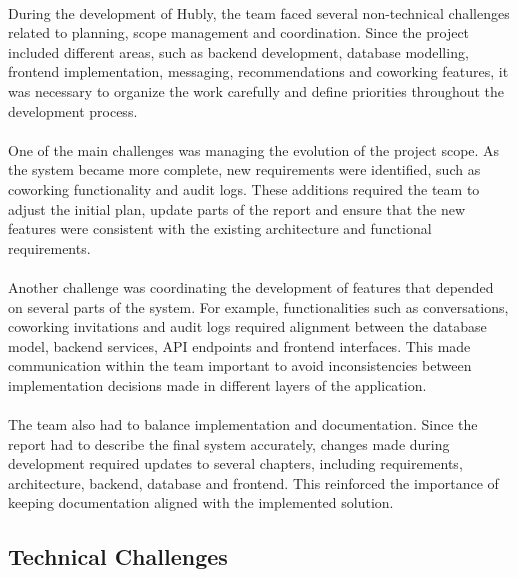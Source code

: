 \paragraph{}During the development of Hubly, the team faced several non-technical challenges related to planning, scope management and coordination. Since the project included different areas, such as backend development, database modelling, frontend implementation, messaging, recommendations and coworking features, it was necessary to organize the work carefully and define priorities throughout the development process.

\paragraph{}One of the main challenges was managing the evolution of the project scope. As the system became more complete, new requirements were identified, such as coworking functionality and audit logs. These additions required the team to adjust the initial plan, update parts of the report and ensure that the new features were consistent with the existing architecture and functional requirements.

\paragraph{}Another challenge was coordinating the development of features that depended on several parts of the system. For example, functionalities such as conversations, coworking invitations and audit logs required alignment between the database model, backend services, API endpoints and frontend interfaces. This made communication within the team important to avoid inconsistencies between implementation decisions made in different layers of the application.

\paragraph{}The team also had to balance implementation and documentation. Since the report had to describe the final system accurately, changes made during development required updates to several chapters, including requirements, architecture, backend, database and frontend. This reinforced the importance of keeping documentation aligned with the implemented solution.

\subsection{Technical Challenges}

